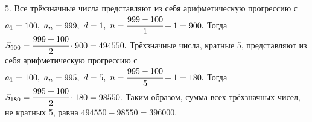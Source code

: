 5. Все трёхзначные числа представляют из себя арифметическую прогрессию с $a_1=100,\ a_n=999,\ d=1,\ n=\cfrac{999-100}{1}+1=900.$ Тогда $S_{900}=\cfrac{999+100}{2}\cdot900=494550.$ Трёхзначные числа, кратные 5, представляют из себя арифметическую прогрессию с $a_1=100,\ a_n=995,\ d=5,\ n=\cfrac{995-100}{5}+1=180.$ Тогда $S_{180}=\cfrac{995+100}{2}\cdot180=98550.$ Таким образом, сумма всех трёхзначных чисел, не кратных 5, равна $494550-98550=396000.$\\
